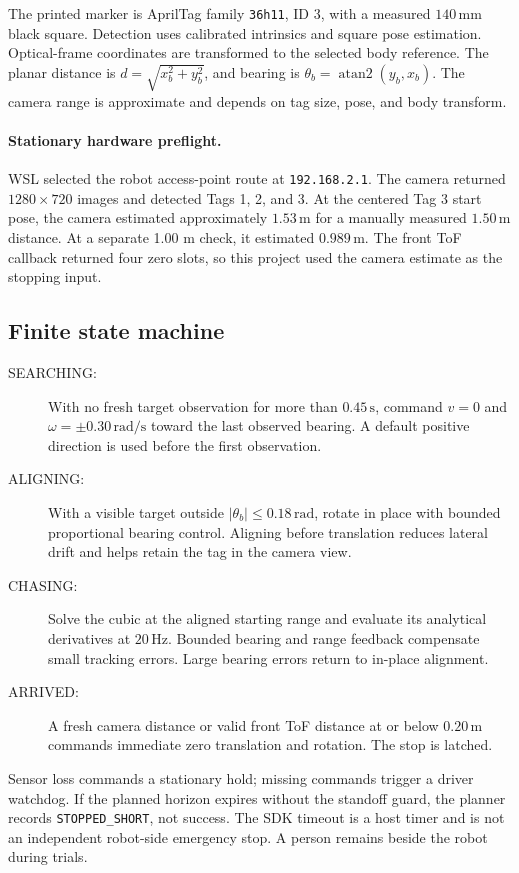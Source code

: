 \documentclass[11pt,a4paper]{article}
\begin{document}
The printed marker is AprilTag family \texttt{36h11}, ID 3, with a measured $140\,\mathrm{mm}$ black square. Detection uses calibrated intrinsics and square pose estimation. Optical-frame coordinates are transformed to the selected body reference. The planar distance is $d=\sqrt{x_b^2+y_b^2}$, and bearing is $\theta_b=\operatorname{atan2}(y_b,x_b)$. The camera range is approximate and depends on tag size, pose, and body transform.

\paragraph{Stationary hardware preflight.} WSL selected the robot access-point route at \texttt{192.168.2.1}. The camera returned $1280\times720$ images and detected Tags 1, 2, and 3. At the centered Tag 3 start pose, the camera estimated approximately $1.53\,\mathrm{m}$ for a manually measured $1.50\,\mathrm{m}$ distance. At a separate 1.00 m check, it estimated $0.989\,\mathrm{m}$. The front ToF callback returned four zero slots, so this project used the camera estimate as the stopping input.

\subsection{Finite state machine}
\begin{description}
\item[SEARCHING:] With no fresh target observation for more than $0.45\,\mathrm{s}$, command $v=0$ and $\omega=\pm0.30\,\mathrm{rad/s}$ toward the last observed bearing. A default positive direction is used before the first observation.
\item[ALIGNING:] With a visible target outside $|\theta_b|\leq0.18\,\mathrm{rad}$, rotate in place with bounded proportional bearing control. Aligning before translation reduces lateral drift and helps retain the tag in the camera view.
\item[CHASING:] Solve the cubic at the aligned starting range and evaluate its analytical derivatives at $20\,\mathrm{Hz}$. Bounded bearing and range feedback compensate small tracking errors. Large bearing errors return to in-place alignment.
\item[ARRIVED:] A fresh camera distance or valid front ToF distance at or below $0.20\,\mathrm{m}$ commands immediate zero translation and rotation. The stop is latched.
\end{description}
Sensor loss commands a stationary hold; missing commands trigger a driver watchdog. If the planned horizon expires without the standoff guard, the planner records \texttt{STOPPED\_SHORT}, not success. The SDK timeout is a host timer and is not an independent robot-side emergency stop. A person remains beside the robot during trials.
\end{document}
